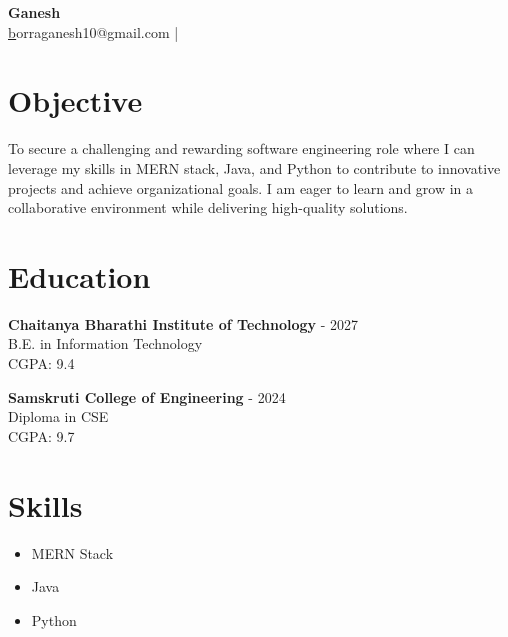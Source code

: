\documentclass[a4paper,10pt]{article}
\begin{document}
\pagestyle{empty}

\begin{center}
    {\LARGE \textbf{ Ganesh }}\\
    \href{mailto: borraganesh10@gmail.com }borraganesh10@gmail.com \quad |  \\
\end{center}


    
\section*{Objective}
\noindent
To secure a challenging and rewarding software engineering role where I can leverage my skills in MERN stack, Java, and Python to contribute to innovative projects and achieve organizational goals. I am eager to learn and grow in a collaborative environment while delivering high-quality solutions.
\vspace{0.3cm}


\section*{Education}

    \textbf{ Chaitanya Bharathi Institute of Technology }  - 2027 \\
    {  } B.E. in Information Technology \\
    {  }  CGPA: 9.4

    \textbf{ Samskruti College of Engineering }  - 2024 \\
    {  } Diploma in CSE \\
    {  }  CGPA: 9.7



\section*{Skills}
\begin{itemize}[leftmargin=*]
  
    \item MERN Stack 
  
    \item Java 
  
    \item Python
  
\end{itemize}


\end{document}
